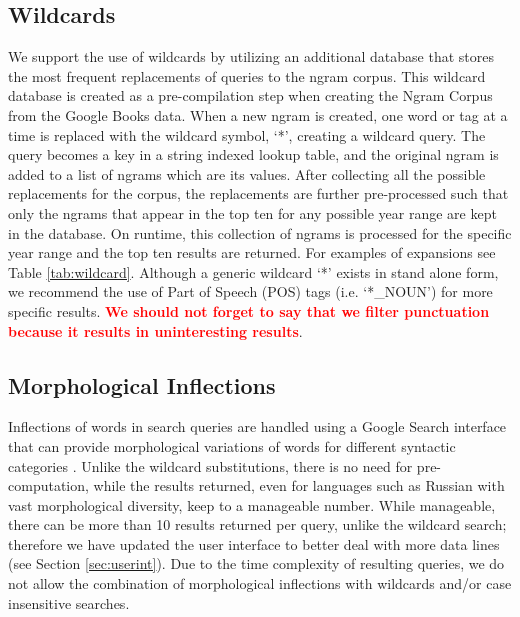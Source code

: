 \documentclass[11pt]{article}
\begin{document}
\subsection{Wildcards}
We support the use of wildcards by utilizing an additional database that stores the most frequent replacements of queries to the ngram corpus. This wildcard database is created as a pre-compilation step when creating the Ngram Corpus from the Google Books data. When a new ngram is created, one word or tag at a time is replaced with the wildcard symbol, `*', creating a wildcard query. The query becomes a key in a string indexed lookup table, and the original ngram is added to a list of ngrams which are its values. After collecting all the possible replacements for the corpus, the replacements are further pre-processed such that only the ngrams that appear in the top ten for any possible year range are kept in the database. On runtime, this collection of ngrams is processed for the specific year range and the top ten results are returned. For examples of expansions see Table \ref{tab:wildcard}. Although a generic wildcard `*' exists in stand alone form, we recommend the use of Part of Speech (POS) tags (i.e. `*\_NOUN') for more specific results.
\textcolor{red}{\bf We should not forget to say that we filter punctuation because it results in uninteresting results}.

\subsection{Morphological Inflections}
Inflections of words in search queries are handled using a Google Search interface that can provide morphological variations of words for different syntactic categories \cite{durrett2013supervised}. Unlike the wildcard substitutions, there is no need for pre-computation, while the results returned, even for languages such as Russian with vast morphological diversity, keep to a manageable number. While manageable, there can be more than 10 results returned per query, unlike the wildcard search; therefore we have updated the user interface to better deal with more data lines (see Section \ref{sec:userint}). Due to the time complexity of resulting queries, we do not allow the combination of morphological inflections with wildcards and/or case insensitive searches.
\end{document}
